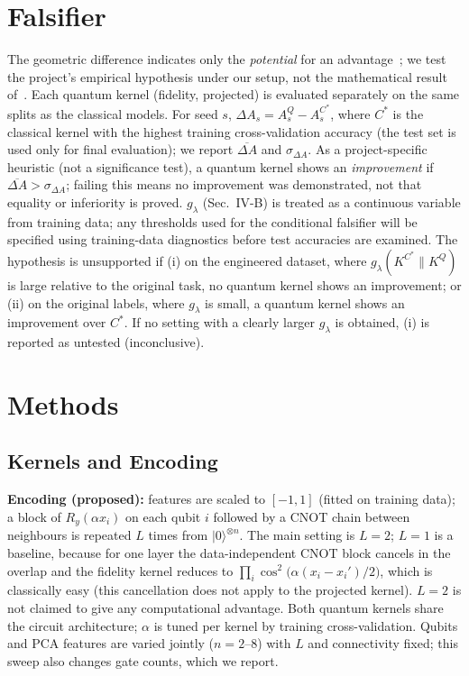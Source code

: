 \documentclass[conference]{IEEEtran}
\begin{document}
\section{Falsifier}
The geometric difference indicates only the \emph{potential} for an advantage~\cite{huang2021}; we test the project's empirical hypothesis under our setup, not the mathematical result of~\cite{huang2021}. Each quantum kernel (fidelity, projected) is evaluated separately on the same splits as the classical models. For seed $s$, $\Delta A_s = A^{Q}_s - A^{C^\ast}_s$, where $C^\ast$ is the classical kernel with the highest training cross-validation accuracy (the test set is used only for final evaluation); we report $\overline{\Delta A}$ and $\sigma_{\Delta A}$. As a project-specific heuristic (not a significance test), a quantum kernel shows an \emph{improvement} if $\overline{\Delta A} > \sigma_{\Delta A}$; failing this means no improvement was demonstrated, not that equality or inferiority is proved. $g_\lambda$ (Sec.~IV-B) is treated as a continuous variable from training data; any thresholds used for the conditional falsifier will be specified using training-data diagnostics before test accuracies are examined. The hypothesis is unsupported if (i) on the engineered dataset, where $g_\lambda(K^{C^\ast}\|K^{Q})$ is large relative to the original task, no quantum kernel shows an improvement; or (ii) on the original labels, where $g_\lambda$ is small, a quantum kernel shows an improvement over $C^\ast$. If no setting with a clearly larger $g_\lambda$ is obtained, (i) is reported as untested (inconclusive).

\section{Methods}
\subsection{Kernels and Encoding}
\textbf{Encoding (proposed):} features are scaled to $[-1,1]$ (fitted on training data); a block of $R_y(\alpha x_i)$ on each qubit $i$ followed by a CNOT chain between neighbours is repeated $L$ times from $|0\rangle^{\otimes n}$. The main setting is $L=2$; $L=1$ is a baseline, because for one layer the data-independent CNOT block cancels in the overlap and the fidelity kernel reduces to $\prod_i\cos^2\!\big(\alpha(x_i-x_i')/2\big)$, which is classically easy (this cancellation does not apply to the projected kernel). $L=2$ is not claimed to give any computational advantage. Both quantum kernels share the circuit architecture; $\alpha$ is tuned per kernel by training cross-validation. Qubits and PCA features are varied jointly ($n=2$--$8$) with $L$ and connectivity fixed; this sweep also changes gate counts, which we report.
\end{document}
